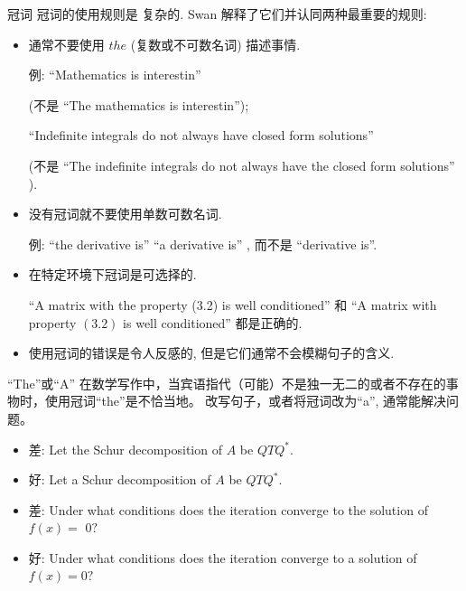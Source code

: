 \documentclass{ctexbeamer}
\begin{document}
\begin{frame}{冠词}
冠词的使用规则是 复杂的. 
{Swan} 解释了它们并认同两种最重要的规则:

\begin{itemize}
    \item  通常不要使用 $t h e$ (复数或不可数名词) 描述事情. 
    
    例: ``Mathematics is interestin''
    
    (不是 ``The mathematics is interestin'');
    
    ``Indefinite integrals do not always have closed form solutions''
    
    (不是 ``The indefinite integrals do not always have the closed form solutions'' ).
    
    \item 没有冠词就不要使用单数可数名词.
    
    例: ``the derivative is'' ``a derivative is'' , 而不是 ``derivative is''.
    
 \item 在特定环境下冠词是可选择的. 

``A matrix with the property (3.2) is well conditioned'' 和 ``A matrix with property $(3.2)$ is well conditioned'' 都是正确的.

 \item 使用冠词的错误是令人反感的, 但是它们通常不会模糊句子的含义.
\end{itemize}

\end{frame}


\begin{frame}{``The''或``A''}
在数学写作中，当宾语指代（可能）\alert{不是独一无二的}或者\alert{不存在的事物}时，使用冠词``the''是不恰当地。
改写句子，或者将冠词改为``a'', 通常能解决问题。
\vspace{10pt}

{
\begin{itemize}
\item 差: Let the Schur decomposition of $A$ be $Q T Q^{*}$. \pause
\item 好: Let a Schur decomposition of $A$ be $Q T Q^{*}$.
	\end{itemize}
}

\vspace{10pt}

\begin{itemize}
\item 差: Under what conditions does the iteration converge to the solution of $f(x)=$ 
$0 ?$  \pause
\item  好: Under what conditions does the iteration converge to a solution of $f(x)=0 ?$
\end{itemize}
\end{frame}
\end{document}
